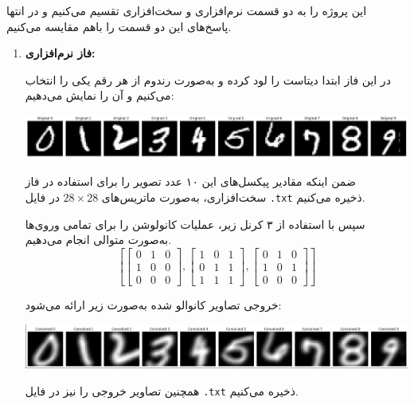 \begin{qsolve}
	این پروژه را به دو قسمت نرم‌افزاری و سخت‌افزاری تقسیم می‌کنیم و در انتها پاسخ‌های این دو قسمت را باهم مقایسه می‌کنیم.
	
	
	\begin{enumerate}
		\item 
		\textbf{فاز نرم‌افزاری:}
		
		در این فاز ابتدا دیتاست  را لود کرده و به‌صورت رندوم از هر رقم یکی را انتخاب می‌کنیم و آن را نمایش می‌دهیم:
		
		\begin{center}
			\includegraphics*[width=1\linewidth]{pics/img2.png}
			\label{ام‌نیست رندوم}
		\end{center}
		
		ضمن اینکه مقادیر پیکسل‌های این ۱۰ عدد تصویر را برای استفاده در فاز سخت‌افزاری، به‌صورت ماتریس‌های $28 \times 28 $ در فایل \texttt{.txt} ذخیره می‌کنیم.
		
		سپس با استفاده از ۳ کرنل زیر، عملیات کانولوشن را برای تمامی وروی‌ها به‌صورت متوالی انجام می‌دهیم.
		$$
		\left[ \begin{bmatrix} 0 & 1 & 0 \\ 1 & 0 & 0 \\ 0 & 0 & 0 \end{bmatrix}, 
		\begin{bmatrix} 1 & 0 & 1 \\ 0 & 1 & 1 \\ 1 & 1 & 1 \end{bmatrix}, 
		\begin{bmatrix} 0 & 1 & 0 \\ 1 & 0 & 1 \\ 0 & 0 & 0 \end{bmatrix} \right]
		$$
		
		خروجی تصاویر کانوالو شده به‌صورت زیر ارائه می‌شود:
		
		\begin{center}
			\includegraphics*[width=1\linewidth]{pics/img3.png}
			\label{تصاویر کانوالو شده}
		\end{center}
		
		همچنین تصاویر خروجی را نیز در فایل \texttt{.txt} ذخیره می‌کنیم.
	\end{enumerate}
\end{qsolve}
